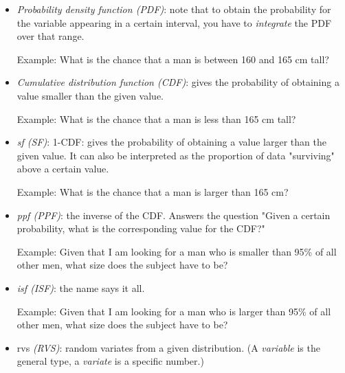 \begin{itemize}
  \item \emph{Probability density function (PDF)}: note that to obtain the probability for the variable appearing in a certain interval, you have to \emph{integrate} the PDF over that range.

      Example: What is the chance that a man is between 160 and 165 cm tall?

  \item \emph{Cumulative distribution function (CDF)}: gives the probability of obtaining a value smaller than the given value.

        Example: What is the chance that a man is less than 165 cm tall?

  \item \emph{\acrfull{sf} (SF)}: 1-CDF: gives the probability of obtaining a value larger than the given value. It can also be interpreted as the proportion of data "surviving" above a certain value.

      Example: What is the chance that a man is larger than 165 cm?

  \item \emph{\acrfull{ppf} (PPF)}: the inverse of the CDF. Answers the question "Given a certain probability, what is the corresponding value for the CDF?"

    Example: Given that I am looking for a man who is smaller than 95\% of all other men, what size does the subject have to be?

  \item \emph{\acrfull{isf} (ISF)}: the name says it all.

      Example: Given that I am looking for a man who is larger than 95\% of all other men, what size does the subject have to be?

  \item \acrfull{rvs} \emph{(RVS)}: random variates from a given distribution. (A \emph{variable} is the general type, a \emph{variate} is a specific number.)

\end{itemize}


